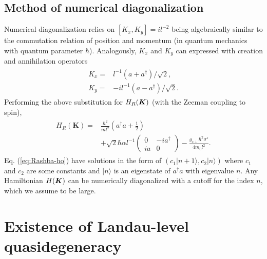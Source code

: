 \documentclass[aps, showpacs, twocolumn, notitlepage, superscriptaddress]{revtex4-1}
\begin{document}
\subsection{Method of numerical diagonalization}\label{sec:numerical}

Numerical diagonalization relies on  $[K_x,K_y]=il^{-2}$ being algebraically similar  to the commutation relation  of position and momentum (in quantum mechanics with quantum parameter $\hbar$). Analogously, $K_x$ and $K_y$ can expressed with creation and annihilation operators
\begin{align}
\begin{split}
K_x=&l^{-1}(a+a^\dagger)/\sqrt{2},\\
K_y=&-il^{-1}(a-a^\dagger)/\sqrt{2}.
\end{split}
\end{align}
Performing the above substitution for  $H_R(\boldsymbol{K})$ (with the Zeeman coupling to spin),
\begin{align}
\begin{split}
H_{R}(\boldsymbol{K})=&\frac{\hbar^2}{ml^2}(a^{\dagger}a+\frac{1}{2})
\\&+\sqrt{2}\hbar\alpha l^{-1}\left(\begin{array}{cc}
0 & -ia^{\dagger}\\
ia & 0
\end{array}\right)
-\frac{g_{s\perp}\hbar^2\sigma^z}{4m_0l^2}.
\end{split}\label{eq:Rashba-ho}
\end{align}
Eq. (\ref{eq:Rashba-ho}) have solutions in the form of $(c_1|n+1\rangle,c_2|n\rangle)$ where $c_1$ and $c_2$ are some constants and $|n\rangle$ is an eigenstate of $a^\dagger a$ with eigenvalue $n$. Any Hamiltonian $H(\boldsymbol{K})$ can be numerically diagonalized with a  cutoff for the index $n$, which we assume to be large.




\section{Existence of Landau-level quasidegeneracy\label{sec:proofLLquasideg}}
\end{document}
